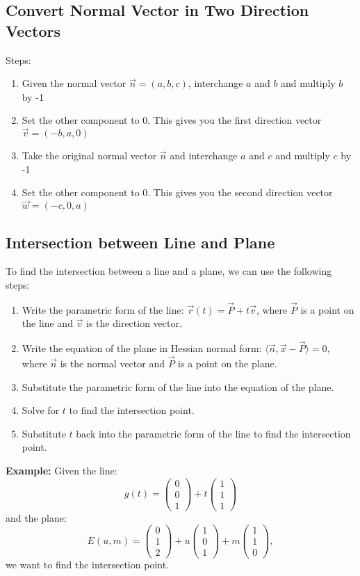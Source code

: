 \subsection{Convert Normal Vector in Two Direction Vectors}
Steps:
\begin{enumerate}
	\item Given the normal vector \(\vec{n} = (a, b, c)\), interchange \(a\) and \(b\) and multiply \(b\) by -1
	\item Set the other component to 0. This gives you the first direction vector \(\vec{v} = (-b, a, 0)\)
	\item Take the original normal vector \(\vec{n}\) and interchange \(a\) and \(c\) and multiply \(c\) by -1
	\item Set the other component to 0. This gives you the second direction vector \(\vec{w} = (-c, 0, a)\)
\end{enumerate}

\subsection{Intersection between Line and Plane}
To find the intersection between a line and a plane, we can use the following steps:
\begin{enumerate}
	\item Write the parametric form of the line: \(\vec{r}(t) = \vec{P} + t\vec{v}\), where \(\vec{P}\) is a point on the line and \(\vec{v}\) is the direction vector.
	\item Write the equation of the plane in Hessian normal form: \(\langle \vec{n}, \vec{x} - \vec{P} \rangle = 0\), where \(\vec{n}\) is the normal vector and \(\vec{P}\) is a point on the plane.
	\item Substitute the parametric form of the line into the equation of the plane.
	\item Solve for \(t\) to find the intersection point.
	\item Substitute \(t\) back into the parametric form of the line to find the intersection point.
\end{enumerate}
\textbf{Example:}
Given the line:
\[
	g(t) = \begin{pmatrix} 0 \\ 0 \\ 1 \end{pmatrix} + t \begin{pmatrix} 1 \\ 1 \\ 1 \end{pmatrix}
\]
and the plane:
\[
	E(u, m) = \begin{pmatrix} 0 \\ 1 \\ 2 \end{pmatrix} + u \begin{pmatrix} 1 \\ 0 \\ 1 \end{pmatrix} + m \begin{pmatrix} 1 \\ 1 \\ 0 \end{pmatrix},
\]
we want to find the intersection point.

